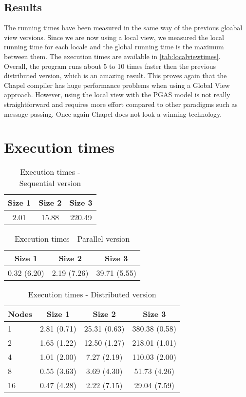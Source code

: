 \documentclass{article}
\begin{document}
\subsection{Results}
The running times have been measured in the same way of the previous gloabal view versions. Since we are now using a local view, we measured the local running time for each locale and the global running time is the maximum between them. The execution times are available in \autoref{tab:localviewtimes}. \\
Overall, the program runs about 5 to 10 times faster then the previous distributed version, which is an amazing result. This proves again that the Chapel compiler has huge performance problems when using a Global View approach. However, using the local view with the PGAS model is not really straightforward and requires more effort compared to other paradigms such as message passing. Once again Chapel does not look a winning technology.


\section{Execution times} \label{sec:executiontimes}

\begin{table}[H]
\centering
\begin{tabular}{|c|c|c|}
\hline
Size 1 & Size 2 & Size 3 \\
\hline
2.01 & 15.88 & 220.49 \\
\hline
\end{tabular}
\caption{Execution times - Sequential version} \label{tab:sequentialtimes}
\end{table}

\begin{table}[H]
\centering
\begin{tabular}{|c|c|c|}
\hline
Size 1 & Size 2 & Size 3 \\ \hline
0.32 (6.20) & 2.19 (7.26) & 39.71 (5.55) \\ \hline
\end{tabular}
\caption{Execution times - Parallel version} \label{tab:paralleltimes}
\end{table}

\begin{table}[H]
\centering
\begin{tabular}{|l|c|c|c|}
\hline
Nodes & Size 1 & Size 2 & Size 3 \\ \hline
1 & 2.81 (0.71) & 25.31 (0.63) & 380.38 (0.58) \\ \hline
2 & 1.65 (1.22) & 12.50 (1.27) & 218.01 (1.01) \\ \hline
4 & 1.01 (2.00) & 7.27 (2.19) & 110.03 (2.00) \\ \hline
8 & 0.55 (3.63) & 3.69 (4.30) & 51.73 (4.26) \\ \hline
16 & 0.47 (4.28) & 2.22 (7.15) & 29.04 (7.59) \\ \hline
\end{tabular}
\caption{Execution times - Distributed version} \label{tab:distributedtimes}
\end{table}
\end{document}
